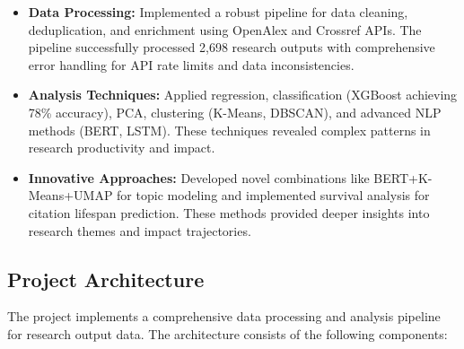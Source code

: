 \documentclass[12pt]{article}
\begin{document}
\begin{itemize}
    \item \textbf{Data Processing:} Implemented a robust pipeline for data cleaning, deduplication, and enrichment using OpenAlex and Crossref APIs. The pipeline successfully processed 2,698 research outputs with comprehensive error handling for API rate limits and data inconsistencies.
    
    \item \textbf{Analysis Techniques:} Applied regression, classification (XGBoost achieving 78\% accuracy), PCA, clustering (K-Means, DBSCAN), and advanced NLP methods (BERT, LSTM). These techniques revealed complex patterns in research productivity and impact.
    
    \item \textbf{Innovative Approaches:} Developed novel combinations like BERT+K-Means+UMAP for topic modeling and implemented survival analysis for citation lifespan prediction. These methods provided deeper insights into research themes and impact trajectories.
\end{itemize}

\subsection{Project Architecture}
The project implements a comprehensive data processing and analysis pipeline for research output data. The architecture consists of the following components:
\end{document}
